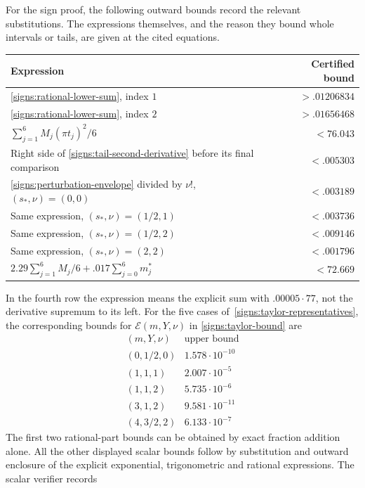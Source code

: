 For the sign proof, the following outward bounds record the relevant
substitutions.  The expressions themselves, and the reason they bound
whole intervals or tails, are given at the cited equations.
\begin{center}
\begin{tabular}{p{.65\linewidth}r}
\toprule
Expression & Certified bound\\
\midrule
\eqref{signs:rational-lower-sum}, index $1$ & $>.01206834$\\
\eqref{signs:rational-lower-sum}, index $2$ & $>.01656468$\\
$\sum_{j=1}^6 M_j(\pi t_j)^2/6$ & $<76.043$\\
Right side of \eqref{signs:tail-second-derivative}
before its final comparison & $<.005303$\\
\eqref{signs:perturbation-envelope} divided by $\nu!$,
$(s_*,\nu)=(0,0)$ & $<.003189$\\
Same expression, $(s_*,\nu)=(1/2,1)$ & $<.003736$\\
Same expression, $(s_*,\nu)=(1/2,2)$ & $<.009146$\\
Same expression, $(s_*,\nu)=(2,2)$ & $<.001796$\\
$2.29\sum_{j=1}^6M_j/6+.017\sum_{j=0}^6m_j^*$ & $<72.669$\\
\bottomrule
\end{tabular}
\end{center}
In the fourth row the expression means the explicit sum with
$.00005\cdot77$, not the derivative supremum to its left.
For the five cases of~\eqref{signs:taylor-representatives}, the
corresponding bounds for $\mathcal E(m,Y,\nu)$ in
\eqref{signs:taylor-bound} are
\begin{equation}\label{cert:taylor-substitutions}
\begin{array}{c|c}
 (m,Y,\nu)&\text{upper bound}\\ \hline
 (0,1/2,0)&1.578\cdot10^{-10}\\
 (1,1,1)&2.007\cdot10^{-5}\\
 (1,1,2)&5.735\cdot10^{-6}\\
 (3,1,2)&9.581\cdot10^{-11}\\
 (4,3/2,2)&6.133\cdot10^{-7}
\end{array}
\end{equation}
The first two rational-part bounds can be obtained by exact fraction
addition alone.  All the other displayed scalar bounds follow by
substitution and outward enclosure of the explicit exponential,
trigonometric and rational expressions.  The scalar verifier records

